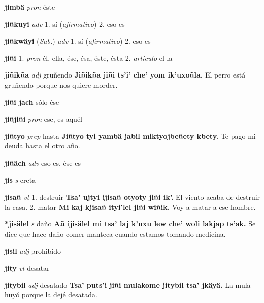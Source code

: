 \documentclass[10pt]{scrbook}
\newcommand{\entry}[1]{\textbf{#1}}
\newcommand{\onedefinition}[1]{#1.}
\newcommand{\partofspeech}[1]{\textit{#1}}
\newcommand{\spanishtranslation}[1]{#1}
\newcommand{\clarification}[1]{(\textit{#1})}
\newcommand{\cholexample}[1]{\textbf{#1}}
\newcommand{\exampletranslation}[1]{#1}
\newcommand{\relevantdialect}[1]{(\textit{#1})}
\begin{document}
\begin{multicols}{2}
\entry{jimbä}
\partofspeech{pron}
\spanishtranslation{éste}

\entry{jiñkuyi}
\partofspeech{adv}
\onedefinition{1}
\spanishtranslation{sí}
\clarification{afirmativo}
\onedefinition{2}
\spanishtranslation{eso es}

\entry{jiñkwäyi}
\relevantdialect{Sab.}
\partofspeech{adv}
\onedefinition{1}
\spanishtranslation{sí}
\clarification{afirmativo}
\onedefinition{2}
\spanishtranslation{eso es}

\entry{jiñi}
\onedefinition{1}
\partofspeech{pron}
\spanishtranslation{él, ella, ése, ésa, éste, ésta}
\onedefinition{2}
\partofspeech{artículo}
\spanishtranslation{el}
\spanishtranslation{la}

\entry{jiñikña}
\partofspeech{adj}
\spanishtranslation{gruñendo}
\cholexample{Jiñikña jiñi ts'i' che' yom ik'uxoñla.}
\exampletranslation{El perro está gruñendo porque nos quiere morder.}

\entry{jiñi jach}
\spanishtranslation{sólo ése}

\entry{jiñjiñi}
\partofspeech{pron}
\spanishtranslation{ese, es aquél}

\entry{jiñtyo}
\partofspeech{prep}
\spanishtranslation{hasta}
\cholexample{Jiñtyo tyi yambä jabil miktyojbeñety kbety.}
\exampletranslation{Te pago mi deuda hasta el otro año.}

\entry{jiñäch}
\partofspeech{adv}
\spanishtranslation{eso es, ése es}

\entry{jis}
\partofspeech{s}
\spanishtranslation{creta}

\entry{jisañ}
\partofspeech{vt}
\onedefinition{1}
\spanishtranslation{destruir}
\cholexample{Tsa' ujtyi ijisañ otyoty jiñi ik'.}
\exampletranslation{El viento acaba de destruir la casa.}
\onedefinition{2}
\spanishtranslation{matar}
\cholexample{Mi kaj kjisañ ityi'lel jiñi wiñik.}
\exampletranslation{Voy a matar a ese hombre.}

\entry{*jisälel}
\partofspeech{s}
\spanishtranslation{daño}
\cholexample{Añ ijisälel mi tsa' laj k'uxu lew che' woli lakjap ts'ak.}
\exampletranslation{Se dice que hace daño comer manteca cuando estamos tomando medicina.}

\entry{jisil}
\partofspeech{adj}
\spanishtranslation{prohibido}

\entry{jity}
\partofspeech{vt}
\spanishtranslation{desatar}

\entry{jitybil}
\partofspeech{adj}
\spanishtranslation{desatado}
\cholexample{Tsa' puts'i jiñi mulakome jitybil tsa' jkäyä.}
\exampletranslation{La mula huyó porque la dejé desatada.}


\end{multicols}
\end{document}
